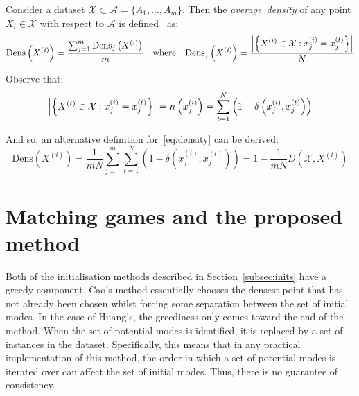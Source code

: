 \begin{definition}\label{def:density}
    Consider a dataset
    \(\mathcal{X} \subset \mathcal{A} = \{A_1, \ldots, A_m\}\). Then the
    \emph{average~density} of any point \(X_i \in \mathcal{X}\) with respect to
    \(\mathcal{A}\) is defined~\cite{Cao2009} as:
    \begin{equation}\label{eq:density}
        \text{Dens}\left(X^{(i)}\right) = \frac{%
            \sum_{j=1}^m \text{Dens}_{j}\left(X^{(i)}\right)
        }{m}
        \quad \text{where} \quad
        \text{Dens}_{j}\left(X^{(i)}\right) = \frac{%
            \abs*{%
                \left\{X^{(t)} \in \mathcal{X} : x_j^{(i)} = x_j^{(t)}\right\}
            }
        }{N}
    \end{equation}

    Observe that:
    \[
        \abs*{\left\{X^{(t)} \in \mathcal{X} : x_j^{(i)} = x_j^{(t)}\right\}}%
        = n\left(x_j^{(i)}\right)%
        = \sum_{t=1}^N \left(1 - \delta\left(x_j^{(i)}, x_j^{(t)}\right)\right)
    \]

    And so, an alternative definition for~\eqref{eq:density} can be derived:
    \begin{equation}\label{eq:density-alt}
        \text{Dens}\left(X^{(i)}\right)
        = \frac{1}{mN} \sum_{j=1}^m \sum_{t=1}^N \left(%
            1 - \delta\left(x_j^{(i)}, x_j^{(t)}\right)
        \right)
        = 1 - \frac{1}{mN} D\left(\mathcal{X}, X^{(i)}\right)
    \end{equation}
\end{definition}



\section{Matching games and the proposed method}\label{sec:method}

Both of the initialisation methods described in Section~\ref{subsec:inits} have
a greedy component. Cao's method essentially chooses the densest point that has
not already been chosen whilst forcing some separation between the set of
initial modes. In the case of Huang's, the greediness only comes toward the end
of the method. When the set of potential modes is identified, it is replaced by
a set of instances in the dataset. Specifically, this means that in any
practical implementation of this method, the order in which a set of potential
modes is iterated over can affect the set of initial modes. Thus, there is no
guarantee of consistency.

